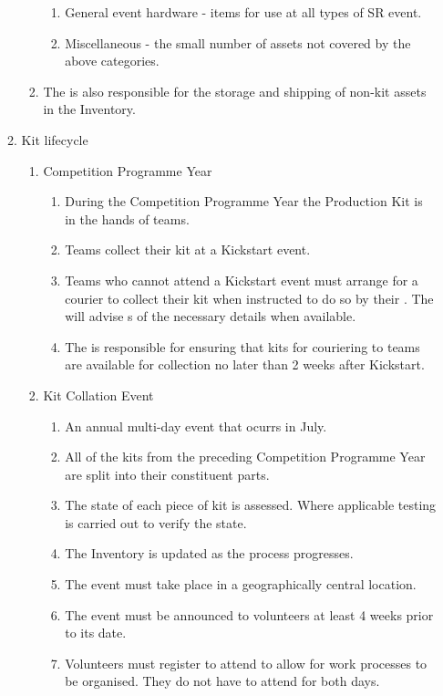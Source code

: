 \begin{draft}
\begin{enumerate}
\begin{enumerate}
\begin{enumerate}
\begin{enumerate}
          \item General event hardware - items for use at all types of SR event.
          \item Miscellaneous - the small number of assets not covered by the above categories.
        \end{enumerate}
      \item The  is also responsible for the storage and shipping of non-kit assets in the Inventory.
    \end{enumerate}
  \item Kit lifecycle
    \begin{enumerate}
      \item Competition Programme Year
        \begin{enumerate}
          \item During the Competition Programme Year the Production Kit is in the hands of teams.
          \item Teams collect their kit at a Kickstart event.
          \item Teams who cannot attend a Kickstart event must arrange for a courier to collect their kit when instructed to do so by their . The  will advise s of the necessary details when available.
          \item The  is responsible for ensuring that kits for couriering to teams are available for collection no later than 2 weeks after Kickstart.
        \end{enumerate}
      \item Kit Collation Event
        \begin{enumerate}
          \item An annual multi-day event that ocurrs in July.
          \item All of the kits from the preceding Competition Programme Year are split into their constituent parts.
          \item The state of each piece of kit is assessed. Where applicable testing is carried out to verify the state.
          \item The Inventory is updated as the process progresses.
          \item The event must take place in a geographically central location.
          \item The event must be announced to volunteers at least 4 weeks prior to its date.
          \item Volunteers must register to attend to allow for work processes to be organised. They do not have to attend for both days.

\end{enumerate}
\end{enumerate}
\end{enumerate}
\end{enumerate}
\end{draft}

